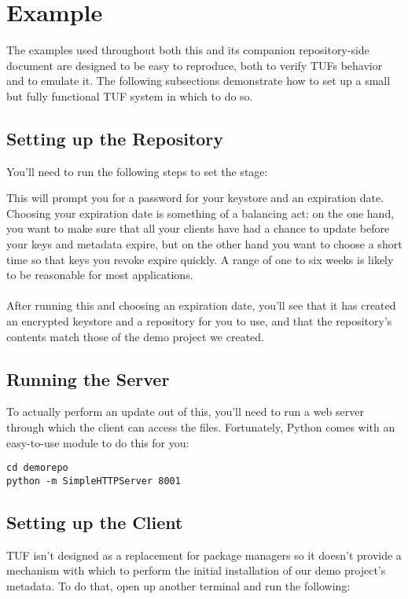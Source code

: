 \documentclass{letter}
\begin{document}
\section{Example}
The examples used throughout both this and its companion repository-side document
are designed to be easy to reproduce, both to verify TUFs behavior and to emulate
it. The following subsections demonstrate how to set up a small but fully
functional TUF system in which to do so.

\subsection{Setting up the Repository}
You'll need to run the following steps to set the stage:


This will prompt you for a password for your keystore and an expiration date.
Choosing your expiration date is something of a balancing act: on the one hand,
you want to make sure that all your clients have had a chance to update before
your keys and metadata expire, but on the other hand you want to choose a short
time so that keys you revoke expire quickly. A range of one to six weeks is likely
to be reasonable for most applications.
\\\\
After running this and choosing an expiration date, you'll see that it has created 
an encrypted keystore and a repository for you to use, and that the repository's 
contents match those of the demo project we created.

\subsection{Running the Server}
To actually perform an update out of this, you'll need to run a web server through
which the client can access the files. Fortunately, Python comes with an easy-to-use
module to do this for you:

\begin{lstlisting}
cd demorepo
python -m SimpleHTTPServer 8001
\end{lstlisting}

\subsection{Setting up the Client}
TUF isn't designed as a replacement for package managers so it doesn't provide
a mechanism with which to perform the initial installation of our demo project's
metadata. To do that, open up another terminal and run the following:
\end{document}
